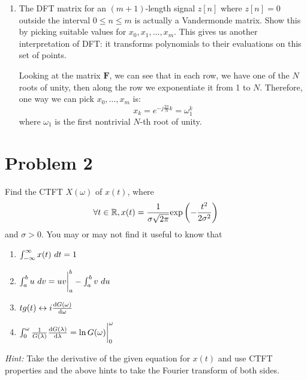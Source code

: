 \documentclass[10pt]{article}
\begin{document}
	\begin{enumerate}[label=\alph*), resume]
		\item The DFT matrix for an \( (m+1) \)-length signal \( z[n] \) where \( z[n] = 0 \) outside 
			the interval \( 0 \le n \le m \) is actually a Vandermonde matrix. Show this by picking suitable 
			values for \( x_0, x_1, \dots, x_m \). This gives us another interpretation of DFT: it transforms 
			polynomials to their evaluations on this set of points.

			\begin{solution}
				Looking at the matrix \( \mathbf F \), we can see that in each row, we have one of the \( N \) 
				roots of unity, then along the row we exponentiate it from 1 to \( N \). Therefore, one way 
				we can pick \( x_0, \dots, x_m \) is:
				\[
				x_k = e^{-j \frac{2\pi}{N} k} = \omega_1^{k}
				\] 
				where \(  \omega_1 \) is the first nontrivial \( N \)-th root of unity.
			\end{solution}
	\end{enumerate}
	\pagebreak
	\section*{Problem 2}
	Find the CTFT \( X(\omega) \) of \( x(t) \), where 
	\[
		\forall t \in \mathbb R, x(t) = \frac{1}{\sigma\sqrt{2\pi} }\mathrm{exp}\left( -\frac{t^2}{2\sigma^2} \right)
	\] 
	and \( \sigma > 0 \). You may or may not find it useful to know that 
	\begin{enumerate}[label=\roman*)]
		\item \( \int_{-\infty}^{\infty} x(t) \ d t  = 1 \) 
		\item \( \int_{a}^{b} u \ d v = uv\biggr|_a^{b} - \int_{a}^{b} v \ d u   \) 
		\item \( tg(t) \leftrightarrow i \dv{G(\omega)}{\omega} \)
		\item \( \int_{0}^{\omega} \frac{1}{G(\lambda)}\dv{G(\lambda)}{\lambda} = \ln G(\omega)\biggr|_0^{\omega}  \)
	\end{enumerate}
	\textit{Hint:} Take the derivative of the given equation for \( x(t) \) and use CTFT properties and the above hints
	to take the Fourier transform of both sides. 
\end{document}
